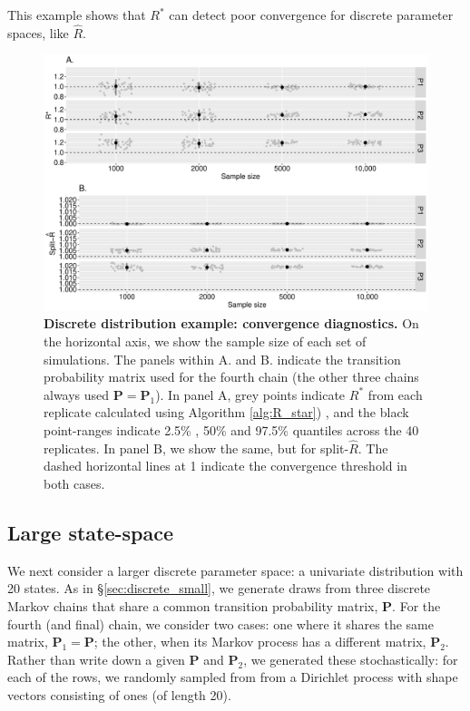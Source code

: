 \documentclass[ba]{imsart}
\numberwithin{equation}{section}
\theoremstyle{plain}
\begin{document}
\begin{supplement}
		This example shows that $R^*$ can detect poor convergence for discrete parameter spaces, like $\widehat{R}$.
		
		
		\begin{figure}[!htb]
			\centerline{\includegraphics[width=1.0\textwidth]{discrete.pdf}}
			\caption{\textbf{Discrete distribution example: convergence diagnostics.} On the horizontal axis, we show the sample size of each set of simulations. The panels within A. and B. indicate the transition probability matrix used for the fourth chain (the other three chains always used $\boldsymbol{P}=\boldsymbol{P}_1$). In panel A, grey points indicate $R^*$ from each replicate calculated using Algorithm \ref{alg:R_star}) , and the black point-ranges indicate 2.5\% , 50\% and 97.5\% quantiles across the 40 replicates. In panel B, we show the same, but for split-$\widehat{R}$. The dashed horizontal lines at 1 indicate the convergence threshold in both cases.}
			\label{fig:discrete}
		\end{figure}
		
		
		\subsection{Large state-space}\label{sec:discrete_large}
		We next consider a larger discrete parameter space: a univariate distribution with 20 states. As in \S\ref{sec:discrete_small}, we generate draws from three discrete Markov chains that share a common transition probability matrix, $\boldsymbol{P}$. For the fourth (and final) chain, we consider two cases: one where it shares the same matrix, $\boldsymbol{P}_1=\boldsymbol{P}$; the other, when its Markov process has a different matrix, $\boldsymbol{P}_2$. Rather than write down a given $\boldsymbol{P}$ and $\boldsymbol{P}_2$, we generated these stochastically: for each of the rows, we randomly sampled from from a Dirichlet process with shape vectors consisting of ones (of length 20).
		

\end{supplement}
\end{document}
